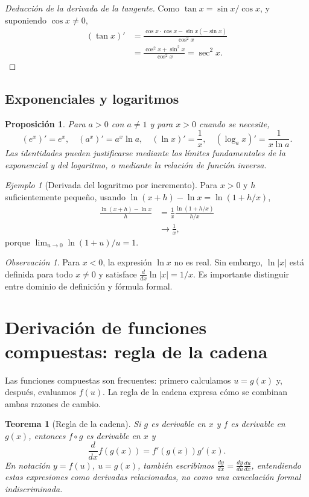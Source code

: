 \documentclass[12pt]{article}
\newtheorem{teorema}[definicion]{Teorema}
\newtheorem{proposicion}[definicion]{Proposición}
\theoremstyle{remark}
\newtheorem{observacion}[definicion]{Observación}
\newtheorem{ejemplo}[definicion]{Ejemplo}
\begin{document}
\begin{proof}[Deducción de la derivada de la tangente]
Como $\tan x=\sin x/\cos x$, y suponiendo $\cos x\ne0$,
\begin{align*}
(\tan x)'&=\frac{\cos x\cdot\cos x-\sin x(-\sin x)}{\cos^2x}\\
&=\frac{\cos^2x+\sin^2x}{\cos^2x}=\boxed{\sec^2x}.
\end{align*}
\end{proof}

\subsection*{Exponenciales y logaritmos}
\begin{proposicion}
Para $a>0$ con $a\ne1$ y para $x>0$ cuando se necesite,
\[
\boxed{(e^x)'=e^x,\quad(a^x)'=a^x\ln a,\quad(\ln x)'=\frac1x,\quad(\log_a x)'=\frac1{x\ln a}.}
\]
Las identidades pueden justificarse mediante los límites fundamentales de la exponencial y del logaritmo, o mediante la relación de función inversa.
\end{proposicion}

\begin{ejemplo}[Derivada del logaritmo por incremento]
Para $x>0$ y $h$ suficientemente pequeño, usando $\ln(x+h)-\ln x=\ln(1+h/x)$,
\begin{align*}
\frac{\ln(x+h)-\ln x}h
&=\frac1x\frac{\ln(1+h/x)}{h/x}\\
&\longrightarrow\frac1x,
\end{align*}
porque $\lim_{u\to0}\ln(1+u)/u=1$.
\end{ejemplo}

\begin{observacion}
Para $x<0$, la expresión $\ln x$ no es real. Sin embargo, $\ln|x|$ está definida para todo $x\ne0$ y satisface $\frac{d}{dx}\ln|x|=1/x$. Es importante distinguir entre dominio de definición y fórmula formal.
\end{observacion}

\section{Derivación de funciones compuestas: regla de la cadena}
Las funciones compuestas son frecuentes: primero calculamos $u=g(x)$ y, después, evaluamos $f(u)$. La regla de la cadena expresa cómo se combinan ambas razones de cambio.

\begin{teorema}[Regla de la cadena]
Si $g$ es derivable en $x$ y $f$ es derivable en $g(x)$, entonces $f\circ g$ es derivable en $x$ y
\[
\boxed{\frac{d}{dx}f(g(x))=f'(g(x))g'(x).}
\]
En notación $y=f(u)$, $u=g(x)$, también escribimos $\displaystyle\frac{dy}{dx}=\frac{dy}{du}\frac{du}{dx}$, entendiendo estas expresiones como derivadas relacionadas, no como una cancelación formal indiscriminada.
\end{teorema}
\end{document}
